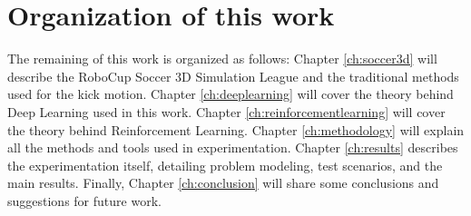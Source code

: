 \section{Organization of this work}

The remaining of this work is organized as follows: Chapter \ref{ch:soccer3d} will describe the RoboCup Soccer 3D Simulation League and the traditional methods used for the kick motion. Chapter \ref{ch:deeplearning} will cover the theory behind Deep Learning used in this work. Chapter \ref {ch:reinforcementlearning} will cover the theory behind Reinforcement Learning. Chapter \ref{ch:methodology} will explain all the methods and tools used in experimentation. Chapter \ref{ch:results} describes the experimentation itself, detailing problem modeling, test scenarios, and the main results. Finally, Chapter \ref{ch:conclusion} will share some conclusions and suggestions for future work.


